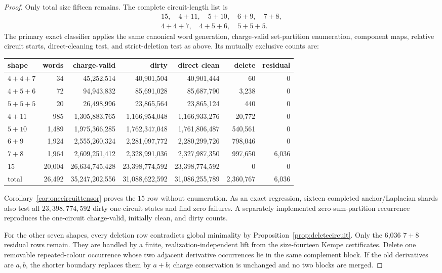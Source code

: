 \documentclass[11pt]{article}
\theoremstyle{definition}
\theoremstyle{remark}
\begin{document}
\begin{proof}
Only total size fifteen remains.  The complete circuit-length list is
\[
\begin{gathered}
15,\quad4+11,\quad5+10,\quad6+9,\quad7+8,\\
4+4+7,\quad4+5+6,\quad5+5+5.
\end{gathered}
\]
The primary exact classifier applies the same canonical word generation,
charge-valid set-partition enumeration, component maps, relative circuit
starts, direct-cleaning test, and strict-deletion test as above.  Its
mutually exclusive counts are:

\begin{center}
\scriptsize
\begin{tabular}{@{}lrrrrrr@{}}
\toprule
shape & words & charge-valid & dirty & direct clean & delete & residual\\
\midrule
\(4+4+7\)&34&45,252,514&40,901,504&40,901,444&60&0\\
\(4+5+6\)&72&94,943,832&85,691,028&85,687,790&3,238&0\\
\(5+5+5\)&20&26,498,996&23,865,564&23,865,124&440&0\\
\(4+11\)&985&1,305,883,765&1,166,954,048&1,166,933,276&20,772&0\\
\(5+10\)&1,489&1,975,366,285&1,762,347,048&1,761,806,487&540,561&0\\
\(6+9\)&1,924&2,555,260,324&2,281,097,772&2,280,299,726&798,046&0\\
\(7+8\)&1,964&2,609,251,412&2,328,991,036&2,327,987,350&997,650&6,036\\
\(15\)&20,004&26,634,745,428&23,398,774,592&23,398,774,592&0&0\\
\midrule
total&26,492&35,247,202,556&31,088,622,592&
31,086,255,789&2,360,767&6,036\\
\bottomrule
\end{tabular}
\end{center}

Corollary~\ref{cor:onecircuittensor} proves the \(15\) row without
enumeration.  As an exact regression, sixteen completed anchor/Laplacian
shards also test all \(23{,}398{,}774{,}592\) dirty one-circuit states
and find zero failures.  A separately implemented zero-sum-partition
recurrence reproduces the one-circuit charge-valid, initially clean, and
dirty counts.

For the other seven shapes, every deletion row contradicts global
minimality by Proposition~\ref{prop:deletecircuit}.  Only the 6,036
\(7+8\) residual rows remain.  They are handled by a finite,
realization-independent lift from the size-fourteen Kempe certificates.
Delete one removable repeated-colour occurrence whose two adjacent
derivative occurrences lie in the same complement block.  If the old
derivatives are \(a,b\), the shorter boundary replaces them by \(a+b\);
charge conservation is unchanged and no two blocks are merged.


\end{proof}
\end{document}
